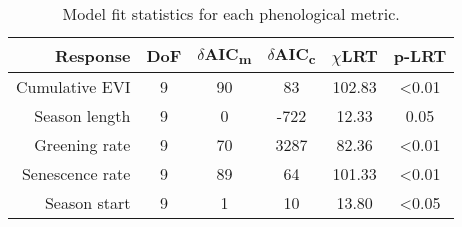 \begin{table}[ht]
\centering
\begin{tabular}{rccccc}
  \hline
Response & DoF & $\delta$AIC\textsubscript{m} & $\delta$AIC\textsubscript{c} & $\chi$LRT & p-LRT \\
  \hline
Cumulative EVI &   9 &  90 &  83 & 102.83 & <0.01 \\ 
  Season length &   9 &   0 & -722 & 12.33 & 0.05 \\ 
  Greening rate &   9 &  70 & 3287 & 82.36 & <0.01 \\ 
  Senescence rate &   9 &  89 &  64 & 101.33 & <0.01 \\ 
  Season start &   9 &   1 &  10 & 13.80 & <0.05 \\ 
   \hline
\end{tabular}
\caption{Model fit statistics for each phenological metric.} 
\label{spamm_stat}
\end{table}

